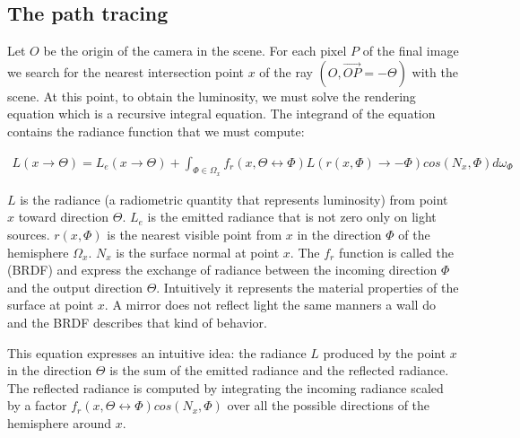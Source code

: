 %
%

\subsection{The path tracing}

Let $O$ be the origin of the camera in the scene. For each pixel $P$ of the final image we search for the nearest intersection point $x$ of the ray $(O, \overrightarrow{OP} = -\Theta)$ with the scene. At this point, to obtain the luminosity, we must solve the rendering equation \cite{Ka86} which is a recursive integral equation. The integrand of the equation contains the radiance function that we must compute:

\begin{align*}
L(x \rightarrow \Theta) = L_e(x \rightarrow \Theta) + \int_{\Phi \in \Omega_x} f_r(x, \Theta \leftrightarrow \Phi) L(r(x, \Phi) \rightarrow -\Phi) cos(N_x, \Phi) d\omega_\Phi
\end{align*}

$L$ is the radiance (a radiometric quantity that represents luminosity) from point $x$ toward direction $\Theta$. $L_e$ is the emitted radiance that is not zero only on light sources. $r(x, \Phi)$ is the nearest visible point from $x$ in the direction $\Phi$ of the hemisphere $\Omega_x$. $N_x$ is the surface normal at point $x$. The $f_r$ function is called the  (BRDF) and express the exchange of radiance between the incoming direction $\Phi$ and the output direction $\Theta$. Intuitively it represents the material properties of the surface at point $x$. A mirror does not reflect light the same manners a wall do and the BRDF describes that kind of behavior.

This equation expresses an intuitive idea: the radiance $L$ produced by the point $x$ in the direction $\Theta$ is the sum of the emitted radiance and the reflected radiance.  The reflected radiance is computed by integrating the incoming radiance scaled by a factor $f_r(x, \Theta \leftrightarrow \Phi) cos(N_x, \Phi)$ over all the possible directions of the hemisphere around $x$.

